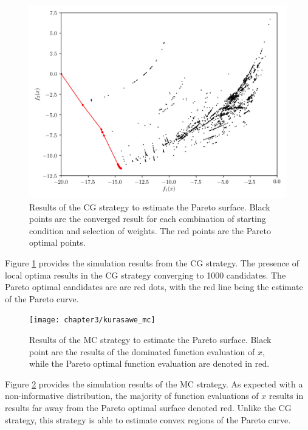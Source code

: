 \begin{figure}[htbp]
	\centering
  \includegraphics{chapter3/kurasawe_cg}
  \caption{Results of the CG strategy to estimate the Pareto surface.  Black points are the converged result for each combination of starting condition and selection of weights.  The red points are the Pareto optimal points.}
  \label{fig:kurasawe_cg}
\end{figure}

Figure \ref{fig:kurasawe_cg} provides the simulation results from the CG strategy.  The presence of local optima results in the CG strategy converging to 1000 candidates.  The Pareto optimal candidates are are red dots, with the red line being the estimate of the Pareto curve.

\begin{figure}[htbp]
	\centering
  \texttt{[image: chapter3/kurasawe\_mc]}
  \caption{Results of the MC strategy to estimate the Pareto surface.  Black point are the results of the dominated function evaluation of $x$, while the Pareto optimal function evaluation are denoted in red.}
  \label{fig:kurasawe_mc}
\end{figure}

Figure \ref{fig:kurasawe_mc} provides the simulation results of the MC strategy.   As expected with a non-informative distribution, the majority of function evaluations of $x$ results in results far away from the Pareto optimal surface denoted red.  Unlike the CG strategy, this strategy is able to estimate convex regions of the Pareto curve.

